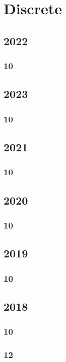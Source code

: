 \documentclass[11pt]{book}
\begin{document}
\chapter{Discrete}
\section{2022}
\subsection{10}

\section{2023}
\subsection{10}

\section{2021}
\subsection{10}

\section{2020}
\subsection{10}

\section{2019}
\subsection{10}

\section{2018}
\subsection{10}

\subsection{12}

\end{document}
